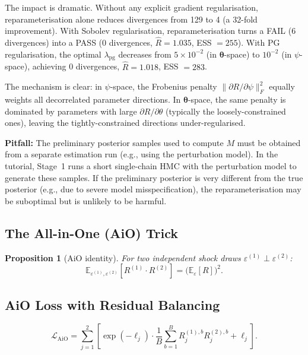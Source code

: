 \documentclass[11pt,a4paper]{article}
\newtheorem{proposition}{Proposition}
\theoremstyle{definition}
\newcommand{\E}{\mathbb{E}}
\newcommand{\btheta}{\boldsymbol{\theta}}
\newcommand{\warn}[1]{\textbf{\color{warncolor}Pitfall:} #1}
\begin{document}
	The impact is dramatic.
	Without any explicit gradient regularisation, reparameterisation alone reduces divergences from 129 to 4 (a 32-fold improvement).
	With Sobolev regularisation, reparameterisation turns a FAIL (6 divergences) into a PASS (0 divergences, $\hat{R} = 1.035$, ESS $= 255$).
	With PG regularisation, the optimal $\lambda_{\mathrm{pg}}$ decreases from $5 \times 10^{-2}$ (in $\btheta$-space) to $10^{-2}$ (in $\psi$-space), achieving 0 divergences, $\hat{R} = 1.018$, ESS $= 283$.
	
	The mechanism is clear: in $\psi$-space, the Frobenius penalty $\|\partial R/\partial\psi\|_F^2$ equally weights all decorrelated parameter directions.
	In $\btheta$-space, the same penalty is dominated by parameters with large $\partial R/\partial\theta$ (typically the loosely-constrained ones), leaving the tightly-constrained directions under-regularised.
	
	\warn{The preliminary posterior samples used to compute $M$ must be obtained from a separate estimation run (e.g., using the perturbation model).
		In the tutorial, Stage~1 runs a short single-chain HMC with the perturbation model to generate these samples.
		If the preliminary posterior is very different from the true posterior (e.g., due to severe model misspecification), the reparameterisation may be suboptimal but is unlikely to be harmful.}
	
	\subsection{The All-in-One (AiO) Trick}
	\label{sec:aio}
	
	\begin{proposition}[AiO identity]
		For two independent shock draws $\varepsilon^{(1)} \perp \varepsilon^{(2)}$:
		\begin{equation}\label{eq:aio_trick}
			\E_{\varepsilon^{(1)}, \varepsilon^{(2)}}\!\left[R^{(1)} \cdot R^{(2)}\right] = \bigl(\E_\varepsilon[R]\bigr)^2.
		\end{equation}
	\end{proposition}
	
	\subsection{AiO Loss with Residual Balancing}
	\label{sec:residual_balancing}
	
	\begin{equation}\label{eq:aio_loss}
		\mathcal{L}_{\mathrm{AiO}} = \sum_{j=1}^{2} \left[\exp(-\ell_j) \cdot \frac{1}{B}\sum_{b=1}^{B} R_j^{(1),b} R_j^{(2),b} + \ell_j\right].
	\end{equation}
	
\end{document}
